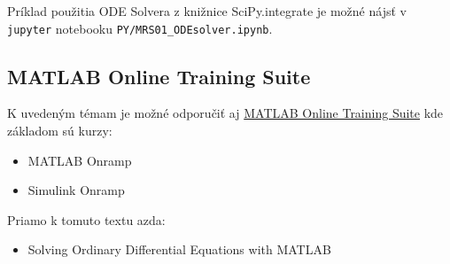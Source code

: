 \documentclass[a4paper, 10pt, ]{article}
\begin{document}
Príklad použitia ODE Solvera z knižnice SciPy.integrate je možné nájsť v \lstinline|jupyter| notebooku \lstinline|PY/MRS01_ODEsolver.ipynb|.










\subsection{MATLAB Online Training Suite}

K uvedeným témam je možné odporučiť aj \href{https://matlabacademy.mathworks.com/online-training-subscription}{MATLAB Online Training Suite} kde základom sú kurzy:

\begin{itemize}[leftmargin=0pt, labelsep=1mm, itemsep=-4pt, topsep=0pt, ]
    \item \textsf{MATLAB Onramp} 
    \item \textsf{Simulink Onramp} 
\end{itemize}

\noindent
Priamo k tomuto textu azda:

\begin{itemize}[leftmargin=0pt, labelsep=1mm, itemsep=-4pt, topsep=0pt, ]
    \item \textsf{Solving Ordinary Differential Equations with MATLAB} 
\end{itemize}
\end{document}
